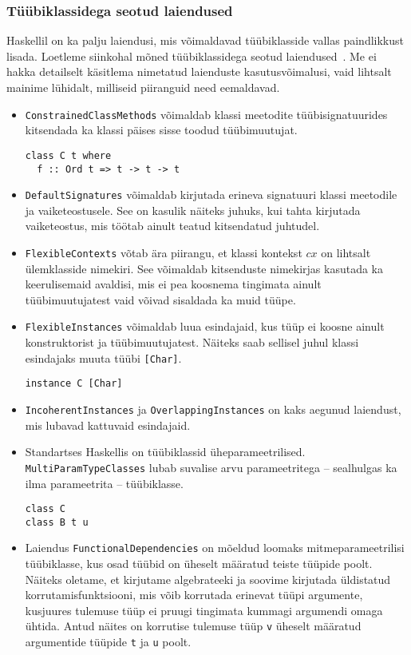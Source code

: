\documentclass[12pt]{article}
\begin{document}
      \subsubsection{Tüübiklassidega seotud laiendused}
        Haskellil on ka palju laiendusi, mis võimaldavad tüübiklasside vallas paindlikkust lisada. Loetleme siinkohal mõned tüübiklassidega seotud laiendused~\cite{Gla}. Me ei hakka detailselt käsitlema nimetatud laienduste kasutusvõimalusi, vaid lihtsalt mainime lühidalt, milliseid piiranguid need eemaldavad.

        \begin{itemize}
          \item
            \verb!ConstrainedClassMethods! võimaldab klassi meetodite tüübisignatuurides kitsendada ka klassi päises sisse toodud tüübimuutujat.

            \begin{verbatim}class C t where
  f :: Ord t => t -> t -> t\end{verbatim}
          \item
            \verb!DefaultSignatures! võimaldab kirjutada erineva signatuuri klassi meetodile ja vaiketeostusele. See on kasulik näiteks juhuks, kui tahta kirjutada vaiketeostus, mis töötab ainult teatud kitsendatud juhtudel.
          \item
            \verb!FlexibleContexts! võtab ära piirangu, et klassi kontekst $cx$ on lihtsalt ülemklasside nimekiri. See võimaldab kitsenduste nimekirjas kasutada ka keerulisemaid avaldisi, mis ei pea koosnema tingimata ainult tüübimuutujatest vaid võivad sisaldada ka muid tüüpe.
          \item
            \verb!FlexibleInstances! võimaldab luua esindajaid, kus tüüp ei koosne ainult konstruktorist ja tüübimuutujatest. Näiteks saab sellisel juhul klassi esindajaks muuta tüübi \verb![Char]!.

            \begin{verbatim}instance C [Char]\end{verbatim}
          \item
            \verb!IncoherentInstances! ja \verb!OverlappingInstances! on kaks aegunud laiendust, mis lubavad kattuvaid esindajaid.
          \item
            Standartses Haskellis on tüübiklassid üheparameetrilised. \verb!MultiParamTypeClasses! lubab suvalise arvu parameetritega -- sealhulgas ka ilma parameetrita -- tüübiklasse.

            \begin{verbatim}
class C
class B t u\end{verbatim}
          \item
            Laiendus \verb!FunctionalDependencies! on mõeldud loomaks mitmeparameetrilisi tüübiklasse, kus osad tüübid on üheselt määratud teiste tüüpide poolt. Näiteks oletame, et kirjutame algebrateeki ja soovime kirjutada üldistatud korrutamisfunktsiooni, mis võib korrutada erinevat tüüpi argumente, kusjuures tulemuse tüüp ei pruugi tingimata kummagi argumendi omaga ühtida. Antud näites on korrutise tulemuse tüüp \verb!v! üheselt määratud argumentide tüüpide \verb!t! ja \verb!u! poolt.


\end{itemize}
\end{document}
